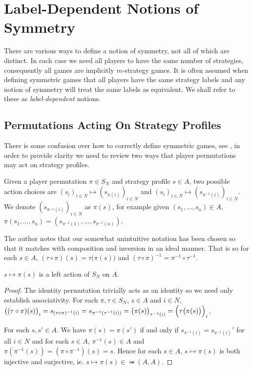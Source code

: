 \section{Label-Dependent Notions of Symmetry} \label{sec:labdepnotions}
There are various ways to define a notion of symmetry, not all of which are distinct. In each case we need all players to have the same number of strategies, consequently all games are implicitly $m$-strategy games. It is often assumed when defining symmetric games that all players have the same strategy labels and any notion of symmetry will treat the same labels as equivalent. We shall refer to these as \textit{label-dependent} notions. 

\subsection{Permutations Acting On Strategy Profiles}
There is some confusion over how to correctly define symmetric games, see \cite[Definition 7]{DMaskin}, in order to provide clarity we need to review two ways that player permutations may act on strategy profiles. 

Given a player permutation $\pi \in S_N$ and strategy profile $s \in A$, two possible action choices are $(s_i)_{i \in N} \mapsto (s_{\pi(i)})_{i \in N}$ and $(s_i)_{i \in N} \mapsto (s_{\pi^{-1}(i)})_{i \in N}$. We denote $(s_{\pi^{-1}(i)})_{i \in N}$ as $\pi(s)$, for example given $(s_1, \ldots, s_n) \in A$, $\pi(s_1, \ldots, s_n) = (s_{\pi^{-1}(1)}, \ldots, s_{\pi^{-1}(n)})$.

The author notes that our somewhat unintuitive notation has been chosen so that it matches with composition and inversion in an ideal manner. That is so for each $s \in A$, $(\tau \circ \pi)(s) = \tau\bigl(\pi(s)\bigr)$ and $(\tau \circ \pi)^{-1} = \pi^{-1} \circ \tau^{-1}$. 

\begin{lemma} \label{simpleactionprop}
	$s \mapsto \pi(s)$ is a left action of $S_N$ on $A$.
	\begin{proof}
		The identity permutation trivially acts as an identity so we need only establish associativity. For each $\pi, \tau \in S_N$, $s \in A$ and $i \in N$, $\bigl((\tau \circ \pi)(s)\bigr)_i = s_{(\tau \circ \pi)^{-1}(i)} = s_{\pi^{-1}(\tau^{-1}(i))} = \bigl(\pi(s)\bigr)_{\tau^{-1}(i)} = \Bigl(\tau\bigl(\pi(s)\bigr)\Bigr)_i$.
		
		For each $s, s' \in A$. We have $\pi(s) = \pi(s')$ if and only if $s_{\pi^{-1}(i)} = s_{\pi^{-1}(i)}'$ for all $i \in N$ and for each $s \in A$, $\pi^{-1}(s) \in A$ and $\pi(\pi^{-1}(s)) = (\pi \circ \pi^{-1})(s) = s$. Hence for each $s \in A$, $s \mapsto \pi(s)$ is both injective and surjective, ie. $s \mapsto \pi(s) \in \bij(A, A)$.
	\end{proof}
\end{lemma}


